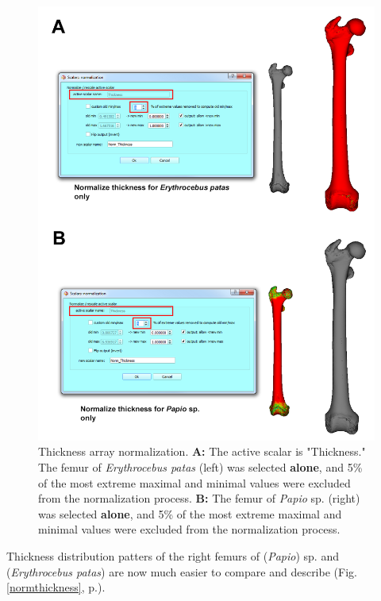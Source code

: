 \documentclass[12pt, a4paper]{book}
\begin{document}
\begin{figure}
  \centering
  \includegraphics[scale=0.43]{Normalize_thickness.png}
\caption{Thickness array normalization. \textbf{A:} The active scalar is "Thickness." The femur of \textit{Erythrocebus patas} (left) was selected \textbf{alone}, and 5\% of the most extreme maximal and minimal values were excluded from the normalization process. \textbf{B:} The femur of \textit{Papio} sp. (right) was selected \textbf{alone}, and 5\% of the most extreme maximal and minimal values were excluded from the normalization process.}	
\label{normalize_thickness}
 \end{figure}

Thickness distribution patters of the right femurs of (\textit{Papio}) sp. and (\textit{Erythrocebus patas}) are now much easier to compare and describe (Fig. \ref{normthickness}, p.\pageref{normthickness}). 
\end{document}
